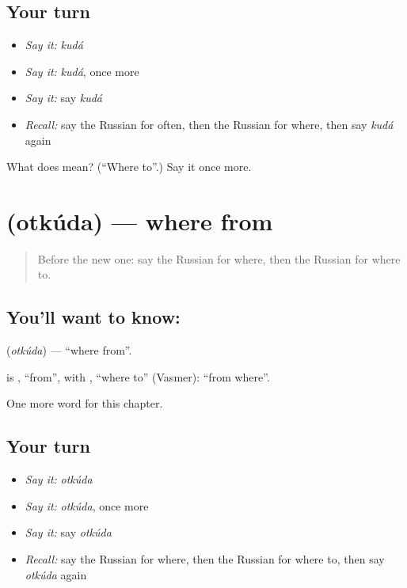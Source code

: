 \subsection*{Your turn}
\begin{itemize}
\raggedright
  \item \emph{Say it:} \emph{kudá}
  \item \emph{Say it:} \emph{kudá}, once more
  \item \emph{Say it:} say \emph{kudá}
  \item \emph{Recall:} say the Russian for often, then the Russian for where, then say \emph{kudá} again
\end{itemize}

\begin{tcolorbox}[breakable,colback=teal!4,colframe=teal!35!black,title={Before you move on}]
What does  mean? (\textquotedblleft{}Where to\textquotedblright{}.) Say it once more.
\end{tcolorbox}
\section[\texorpdfstring{\ru{откуда} (otkúda)}{откуда (otkúda)}]{ (otkúda) — where from}

\label{lesson:RU-C86-where-from}



\begin{quote}
Before the new one: say the Russian for where, then the Russian for where to.
\end{quote}

\subsection*{You'll want to know: }
\textbf{} (\emph{otkúda}) — \textquotedblleft{}where from\textquotedblright{}.

\begin{cousinweb}
\textbf{} is \emph{}, \textquotedblleft{}from\textquotedblright{}, with \emph{}, \textquotedblleft{}where to\textquotedblright{} (Vasmer): \textquotedblleft{}from where\textquotedblright{}.
\end{cousinweb}

\begin{grammarlens}[title={What you've built}]
One more word for this chapter.
\end{grammarlens}

\subsection*{Your turn}
\begin{itemize}
\raggedright
  \item \emph{Say it:} \emph{otkúda}
  \item \emph{Say it:} \emph{otkúda}, once more
  \item \emph{Say it:} say \emph{otkúda}
  \item \emph{Recall:} say the Russian for where, then the Russian for where to, then say \emph{otkúda} again
\end{itemize}

